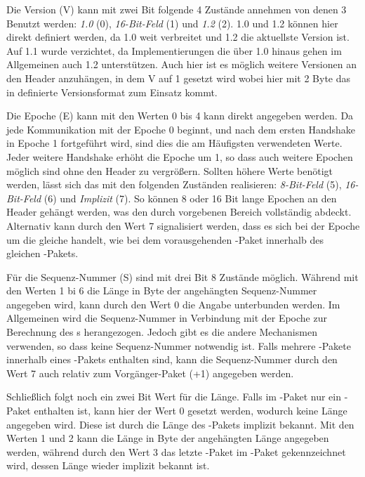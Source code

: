 Die Version (V) kann mit zwei Bit folgende 4 Zustände annehmen von denen 3 Benutzt werden: \textit{ 1.0} (0), \textit{16-Bit-Feld} (1) und
\textit{ 1.2} (2).  1.0 und  1.2 können hier direkt definiert werden, da  1.0 weit verbreitet
 und  1.2 die aktuellste Version ist. Auf  1.1 wurde verzichtet, da Implementierungen die über  1.0 hinaus gehen im Allgemeinen auch
 1.2 unterstützen. Auch hier ist es möglich weitere Versionen an den Header anzuhängen, in dem V auf 1 gesetzt wird wobei hier mit 2 Byte das in 
definierte Versionsformat zum Einsatz kommt.

Die Epoche (E) kann mit den Werten 0 bis 4 kann direkt angegeben werden. Da jede Kommunikation mit der Epoche 0 beginnt, und
nach dem ersten Handshake in Epoche 1 fortgeführt wird, sind dies die am Häufigsten verwendeten Werte. Jeder weitere Handshake erhöht die Epoche um 1, so dass auch
weitere Epochen möglich sind ohne den Header zu vergrößern. Sollten höhere Werte benötigt werden, lässt sich das mit den folgenden Zuständen realisieren:
\textit{8-Bit-Feld} (5), \textit{16-Bit-Feld} (6) und \textit{Implizit} (7). So können 8 oder 16 Bit lange Epochen an den Header gehängt werden, was den
durch  vorgebenen Bereich vollständig abdeckt. Alternativ kann durch den Wert 7 signalisiert werden, dass es sich bei der Epoche um die gleiche
handelt, wie bei dem vorausgehenden -Paket innerhalb des gleichen -Pakets.

Für die Sequenz-Nummer (S) sind mit drei Bit 8 Zustände möglich. Während mit den Werten 1 bi 6 die Länge in Byte der angehängten Sequenz-Nummer angegeben wird,
kann durch den Wert 0 die Angabe unterbunden werden. Im Allgemeinen wird die Sequenz-Nummer in Verbindung mit der Epoche zur Berechnung des s herangezogen.
Jedoch gibt es  die andere Mechanismen verwenden, so dass keine Sequenz-Nummer notwendig ist. Falls mehrere -Pakete innerhalb eines
-Pakets enthalten sind, kann die Sequenz-Nummer durch den Wert 7 auch relativ zum Vorgänger-Paket (+1) angegeben werden.

Schließlich folgt noch ein zwei Bit Wert für die Länge. Falls im -Paket nur ein -Paket enthalten ist, kann hier der Wert 0 gesetzt werden, wodurch
keine Länge angegeben wird. Diese ist durch die Länge des -Pakets implizit bekannt. Mit den Werten 1 und 2 kann die Länge in Byte der angehängten Länge
angegeben werden, während durch den Wert 3 das letzte -Paket im -Paket gekennzeichnet wird, dessen Länge wieder implizit bekannt ist.